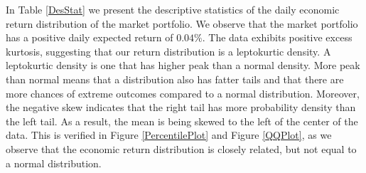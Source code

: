 In Table \ref{DesStat} we present the descriptive statistics of the daily economic return distribution of the market portfolio. We observe that the market portfolio has a positive daily expected return of $0.04\%$. The data exhibits positive excess kurtosis, suggesting that our return distribution is a leptokurtic density. A leptokurtic density is one that has higher peak than a normal density. More peak than normal means that a distribution also has fatter tails and that there are more chances of extreme outcomes compared to a normal distribution. Moreover, the negative skew indicates that the right tail has more probability density than the left tail. As a result, the mean is being skewed to the left of the center of the data. This is verified in Figure \ref{PercentilePlot} and Figure \ref{QQPlot}, as we observe that the economic return distribution is closely related, but not equal to a normal distribution.  

